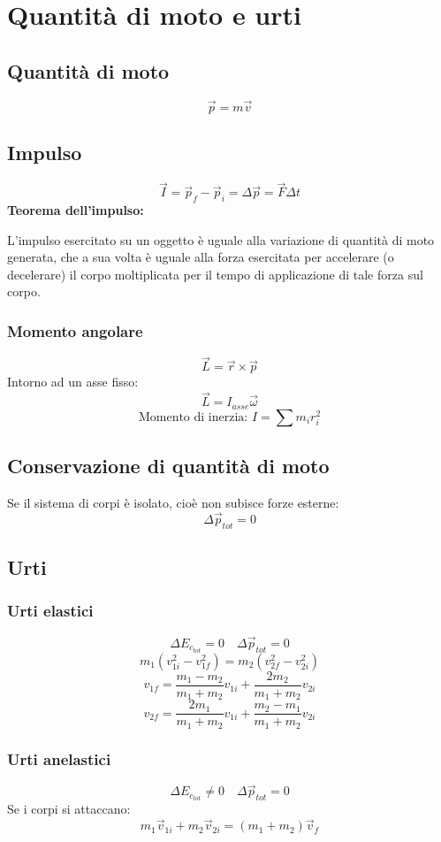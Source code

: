 \documentclass[a4paper]{article}
\theoremstyle{break}
\theoremstyle{break}
\theoremstyle{break}
\theoremstyle{break}
\begin{document}
\section{Quantità di moto e urti}
\subsection{Quantità di moto}
\[
  \vec{p} = m \vec{v}
\]
\subsection{Impulso}
\[
  \vec{I} = \vec{p}_f - \vec{p}_i = \Delta \vec{p} = \vec{F} \Delta t
\]
\textbf{Teorema dell'impulso:}

\noindent L’impulso esercitato su un oggetto è uguale alla variazione di quantità di moto generata, che a sua
volta è uguale alla forza esercitata per accelerare (o decelerare) il corpo moltiplicata per il tempo di
applicazione di tale forza sul corpo.

\subsubsection{Momento angolare}
\[
  \vec{L} = \vec{r} \times \vec{p}
\]
Intorno ad un asse fisso:
\[
  \vec{L} = I_{asse} \vec{\omega}
\]
\[
\text{Momento di inerzia: } I = \sum m_i r_i^2
\] 

\subsection{Conservazione di quantità di moto}
Se il sistema di corpi è isolato, cioè non subisce forze esterne:
\[
  \Delta \vec{p}_{tot} = 0
\]

\subsection{Urti}
\subsubsection{Urti elastici}
\[
  \Delta E_{c_{tot}} = 0 \quad \Delta \vec{p}_{tot} = 0
\] 
\[
  m_1 \left( v_{1i}^2 - v_{1f}^2 \right) = m_2 \left( v_{2f}^2 - v_{2i}^2 \right)
\] 
\[
  v_{1f} = \frac{m_1 - m_2}{m_1 + m_2} v_{1i} + \frac{2 m_2}{m_1 + m_2} v_{2i}
\] 
\[
  v_{2f} = \frac{2 m_1}{m_1 + m_2} v_{1i} + \frac{m_2 - m_1}{m_1 + m_2} v_{2i}
\] 
\subsubsection{Urti anelastici}
\[
  \Delta E_{c_{tot}} \neq 0 \quad \Delta \vec{p}_{tot} = 0
\]
Se i corpi si attaccano:
\[
  m_1 \vec{v}_{1i} + m_2 \vec{v}_{2i} = (m_1 + m_2) \vec{v}_f
\] 
\end{document}
